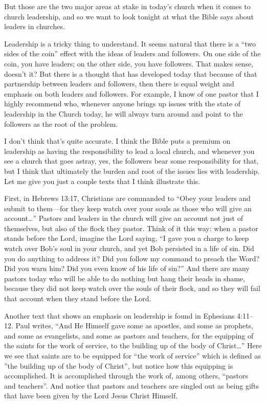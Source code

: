 \documentclass[letterpaper, 12pt]{article}
\begin{document}
    But those are the two major areas at stake in today's church when it
    comes to church leadership, and so we want to look tonight at what
    the Bible says about leaders in churches.

    Leadership is a tricky thing to understand. It seems natural that
    there is a ``two sides of the coin'' effect with the ideas of
    leaders and followers. On one side of the coin, you have leaders; on
    the other side, you have followers. That makes sense, doesn't it?
    But there is a thought that has developed today that because of that
    partnership between leaders and followers, then there is equal
    weight and emphasis on both leaders and followers. For example, I
    know of one pastor that I highly recommend who, whenever anyone
    brings up issues with the state of leadership in the Church today,
    he will always turn around and point to the followers as the root of
    the problem.

    I don't think that's quite accurate. I think the Bible puts a
    premium on leadership as having the responsibility to lead a local
    church, and whenever you see a church that goes astray, yes, the
    followers bear some responsibility for that, but I think that
    ultimately the burden and root of the issues lies with leadership.
    Let me give you just a couple texts that I think illustrate this.
    
    First, in Hebrews 13:17, Christians are commanded to ``Obey your
    leaders and submit to them---for they keep watch over your souls as
    those who will give an account\ldots'' Pastors and leaders in the
    church will give an account not just of themselves, but also of the
    flock they pastor. Think of it this way: when a pastor stands before
    the Lord, imagine the Lord saying, ``I gave you a charge to keep
    watch over Bob's soul in your church, and yet Bob persisted in a
    life of sin. Did you do anything to address it? Did you follow my
    command to preach the Word? Did you warn him? Did you even know of
    his life of sin?'' And there are many pastors today who will be able
    to do nothing but hang their heads in shame, because they did not
    keep watch over the souls of their flock, and so they will fail that
    account when they stand before the Lord.

    Another text that shows an emphasis on leadership is found in
    Ephesians 4:11--12. Paul writes, ``And He Himself gave some as
    apostles, and some as prophets, and some as evangelists, and some as
    pastors and teachers, for the equipping of the saints for the work
    of service, to the building up of the body of Christ\ldots'' Here we
    see that saints are to be equipped for ``the work of service'' which
    is defined as ''the building up of the body of Christ'', but notice
    how this equipping is accomplished. It is accomplished through the
    work of, among others, ``pastors and teachers''. And notice that
    pastors and teachers are singled out as being gifts that have been
    given by the Lord Jesus Christ Himself.
\end{document}
